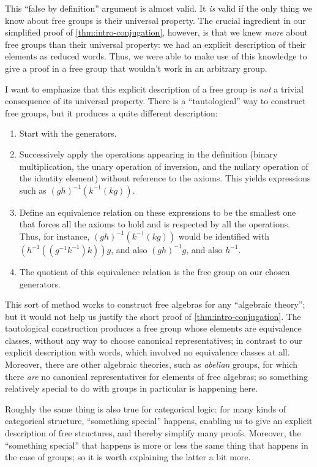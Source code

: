 This ``false by definition'' argument is almost valid.
It \emph{is} valid if the only thing we know about free groups is their universal property.
The crucial ingredient in our simplified proof of \cref{thm:intro-conjugation}, however, is that we knew \emph{more} about free groups than their universal property: we had an explicit description of their elements as reduced words.
Thus, we were able to make use of this knowledge to give a proof in a free group that wouldn't work in an arbitrary group.

I want to emphasize that this explicit description of a free group is \emph{not} a trivial consequence of its universal property.
There is a ``tautological'' way to construct free groups, but it produces a quite different description:
\begin{enumerate}
\item Start with the generators.
\item Successively apply the operations appearing in the definition (binary multiplication, the unary operation of inversion, and the nullary operation of the identity element) without reference to the axioms.
  This yields expressions such as $(g h)^{-1}(k^{-1} (k g))$.
\item Define an equivalence relation on these expressions to be the smallest one that forces all the axioms to hold and is respected by all the operations.
  Thus, for instance, $(g h)^{-1}(k^{-1} (k g))$ would be identified with $(h^{-1} ((g^{-1} k^{-1}) k)) g$, and also $(g h)^{-1} g$, and also $h^{-1}$.
\item The quotient of this equivalence relation is the free group on our chosen generators.
\end{enumerate}

This sort of method works to construct free algebras for any ``algebraic theory''; but it would not help us justify the short proof of \cref{thm:intro-conjugation}.
The tautological construction produces a free group whose elements are equivalence classes, without any way to choose canonical representatives; in contrast to our explicit description with words, which involved no equivalence classes at all.
Moreover, there are other algebraic theories, such as \emph{abelian} groups, for which there \emph{are} no canonical representatives for elements of free algebras; so something relatively special to do with groups in particular is happening here.

Roughly the same thing is also true for categorical logic: for many kinds of categorical structure, ``something special'' happens, enabling us to give an explicit description of free structures, and thereby simplify many proofs.
Moreover, the ``something special'' that happens is more or less the same thing that happens in the case of groups; so it is worth explaining the latter a bit more.

